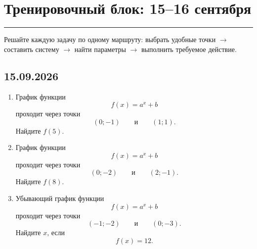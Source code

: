 \documentclass[a4paper,12pt]{article}
\newcommand{\sectionline}{%
  \vspace{-0.2em}
  \textcolor{accent}{\rule{\linewidth}{0.5pt}}
  \vspace{0.25em}
}
\begin{document}
\begin{center}

\end{center}

\clearpage


\section*{Тренировочный блок: 15--16 сентября}
\sectionline

Решайте каждую задачу по одному маршруту:
выбрать удобные точки
$\to$
составить систему
$\to$
найти параметры
$\to$
выполнить требуемое действие.

\subsection*{15.09.2026}

\begin{enumerate}

  \item
  График функции
  \[
      f(x)=a^x+b
  \]
  проходит через точки
  \[
      (0;-1)
      \qquad\text{и}\qquad
      (1;1).
  \]
  Найдите $f(5)$.

  \item
  График функции
  \[
      f(x)=a^x+b
  \]
  проходит через точки
  \[
      (0;-2)
      \qquad\text{и}\qquad
      (2;-1).
  \]
  Найдите $f(8)$.

  \item
  Убывающий график функции
  \[
      f(x)=a^x+b
  \]
  проходит через точки
  \[
      (-1;-2)
      \qquad\text{и}\qquad
      (0;-3).
  \]
  Найдите $x$, если
  \[
      f(x)=12.
  \]

\end{enumerate}
\end{document}
